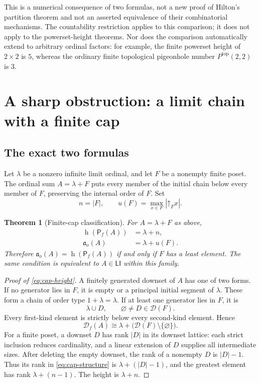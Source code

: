 \documentclass[11pt,letterpaper]{article}
\theoremstyle{teal}
\newtheorem{theorem}{Theorem}[section]
\theoremstyle{definition}
\newcommand{\Pf}{\mathsf P_{\!f}}
\newcommand{\Df}{\mathcal D_{\!f}}
\newcommand{\Down}{\mathcal D}
\newcommand{\hgt}{\operatorname{h}}
\newcommand{\ao}{\mathfrak a_o}
\newcommand{\LI}{\mathsf{LI}}
\newcommand{\up}{\mathord\uparrow}
\begin{document}
This is a numerical consequence of two formulas, not a new proof of Hilton's partition theorem and not an asserted equivalence of their combinatorial mechanisms. The countability restriction applies to this comparison; it does not apply to the powerset-height theorems. Nor does the comparison automatically extend to arbitrary ordinal factors: for example, the finite powerset height of $2\times2$ is $5$, whereas the ordinary finite topological pigeonhole number $P^{\mathrm{top}}(2,2)$ is $3$.

\section{A sharp obstruction: a limit chain with a finite cap}
\subsection{The exact two formulas}
Let $\lambda$ be a nonzero infinite limit ordinal, and let $F$ be a nonempty finite poset. The ordinal sum $A=\lambda+F$ puts every member of the initial chain below every member of $F$, preserving the internal order of $F$. Set
\[
 n=|F|,\qquad u(F)=\max_{x\in F}|\up_Fx|.
\]

\begin{theorem}[Finite-cap classification]\label{thm:caps}
For $A=\lambda+F$ as above,
\begin{align}
 \hgt(\Pf(A))&=\lambda+n,\label{eq:cap-height}\\
 \ao(A)&=\lambda+u(F).\label{eq:cap-ao}
\end{align}
Therefore $\ao(A)=\hgt(\Pf(A))$ if and only if $F$ has a least element. The same condition is equivalent to $A\in\LI$ within this family.
\end{theorem}

\begin{proof}[Proof of \eqref{eq:cap-height}]
A finitely generated downset of $A$ has one of two forms. If no generator lies in $F$, it is empty or a principal initial segment of $\lambda$. These form a chain of order type $1+\lambda=\lambda$. If at least one generator lies in $F$, it is
\[
 \lambda\cup D,\qquad\varnothing\ne D\in\Down(F).
\]
Every first-kind element is strictly below every second-kind element. Hence
\begin{equation}\label{eq:cap-structure}
 \Df(A)\cong\lambda+\bigl(\Down(F)\setminus\{\varnothing\}\bigr).
\end{equation}
For a finite poset, a downset $D$ has rank $|D|$ in its downset lattice: each strict inclusion reduces cardinality, and a linear extension of $D$ supplies all intermediate sizes. After deleting the empty downset, the rank of a nonempty $D$ is $|D|-1$. Thus its rank in \eqref{eq:cap-structure} is $\lambda+(|D|-1)$, and the greatest element has rank $\lambda+(n-1)$. The height is $\lambda+n$.
\end{proof}
\end{document}
